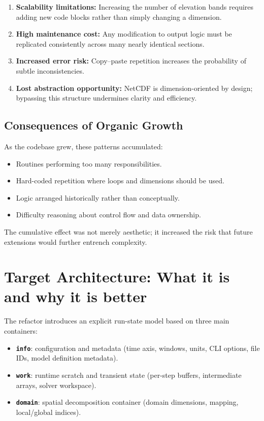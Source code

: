 \documentclass[11pt]{scrartcl}
\begin{document}
\begin{enumerate}
\item \textbf{Scalability limitations:} Increasing the number of elevation bands
      requires adding new code blocks rather than simply changing a dimension.
\item \textbf{High maintenance cost:} Any modification to output logic must be
      replicated consistently across many nearly identical sections.
\item \textbf{Increased error risk:} Copy–paste repetition increases the
      probability of subtle inconsistencies.
\item \textbf{Lost abstraction opportunity:} NetCDF is dimension-oriented by design;
      bypassing this structure undermines clarity and efficiency.
\end{enumerate}

\subsection{Consequences of Organic Growth}

As the codebase grew, these patterns accumulated:

\begin{itemize}
\item Routines performing too many responsibilities.
\item Hard-coded repetition where loops and dimensions should be used.
\item Logic arranged historically rather than conceptually.
\item Difficulty reasoning about control flow and data ownership.
\end{itemize}

The cumulative effect was not merely aesthetic; it increased the risk that
future extensions would further entrench complexity.


\section{Target Architecture: What it is and why it is better}

The refactor introduces an explicit run-state model based on three main containers:

\begin{itemize}[leftmargin=*]
\item \textbf{\texttt{info}}: configuration and metadata (time axis, windows, units, CLI options,
      file IDs, model definition metadata).
\item \textbf{\texttt{work}}: runtime scratch and transient state (per-step buffers, intermediate
      arrays, solver workspace).
\item \textbf{\texttt{domain}}: spatial decomposition container (domain dimensions, mapping, local/global indices).
\end{itemize}
\end{document}
